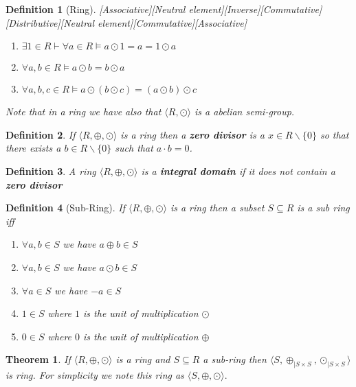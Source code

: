 \documentclass{book}
\newcommand{\nobracket}{}
\newcommand{\tmstrong}[1]{\textbf{#1}}
\newtheorem{definition}{Definition}
{\theorembodyfont{\rmfamily}\newtheorem{example}{Example}}
\newtheorem{theorem}{Theorem}
\begin{document}
{{\begin{definition}[Ring][Associative][Neutral
element][Inverse][Commutative][Distributive][Neutral
element][Commutative][Associative]
\begin{enumerate}
    \item $\exists 1 \in R \vdash \forall a \in R \vDash a \odot 1 = a = 1
    \odot a$
    
    \item $\forall a, b \in R \vDash a \odot b = b \odot a$
    
    \item $\forall a, b, c \in R \vDash a \odot (b \odot c) = (a \odot b)
    \odot c$
  \end{enumerate}
  Note that in a ring we have also that $\langle R, \odot \rangle$ is a
  abelian semi-group.
\end{definition}

\begin{definition}
  {}If $\langle R, \oplus, \odot \rangle$ is a ring then a
  {\tmstrong{zero divisor}} is a $x \in R \backslash \{ 0 \}$ so that there
  exists a $b \in R \backslash \{ 0 \}$ such that $a \cdot b = 0$. 
\end{definition}

\begin{definition}
  {}A ring $\langle R, \oplus, \odot \rangle$ is a
  {\tmstrong{integral domain}} if it does not contain a {\tmstrong{zero
  divisor}}
\end{definition}

\begin{definition}[Sub-Ring]
  \label{sub-ring}{}If $\langle R, \oplus, \odot \rangle$ is a
  ring then a subset $S \subseteq R$ is a sub ring iff
  \begin{enumerate}
    \item $\forall a, b \in S$ we have $a \oplus b \in S$
    
    \item $\forall a, b \in S$ we have $a \odot b \in S$
    
    \item $\forall a \in S$ we have $- a \in S$
    
    \item $1 \in S$ where $1$ is the unit of multiplication $\odot$
    
    \item $0 \in S$ where $0$ is the unit of multiplication $\oplus$
  \end{enumerate}
\end{definition}

\begin{theorem}
  \label{subring is a ring}If $\langle R, \oplus, \odot \rangle$ is a ring and
  $S \subseteq R$ a sub-ring then $\langle S, \oplus_{| S \times S
  \nobracket}, \odot_{| S \times S \nobracket} \rangle$ is ring. For
  simplicity we note this ring as $\langle S, \oplus, \odot \rangle .$
\end{theorem}

}}
\end{document}
